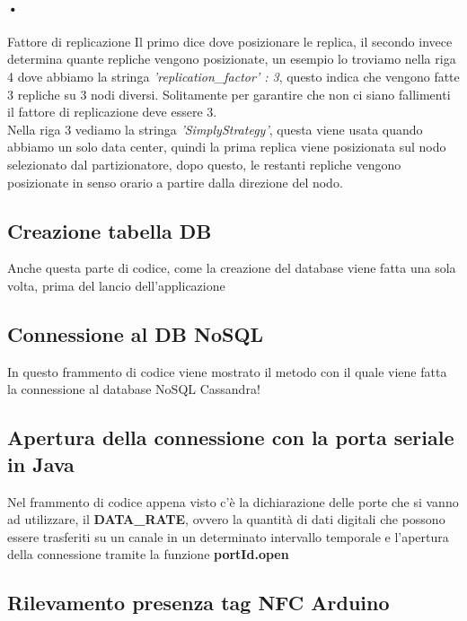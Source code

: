 \paragraph{•} Fattore di replicazione
Il primo dice dove posizionare le replica, il secondo invece determina quante repliche vengono posizionate, un esempio lo troviamo nella riga 4 dove abbiamo la stringa \textit{'replication\_factor' : 3}, questo indica che vengono fatte 3 repliche su 3 nodi diversi. Solitamente per garantire che non ci siano fallimenti il fattore di replicazione deve essere 3.
\\Nella riga 3 vediamo la stringa \textit{'SimplyStrategy'}, questa viene usata quando abbiamo un solo data center, quindi la prima replica viene posizionata sul nodo selezionato dal partizionatore, dopo questo, le restanti repliche vengono posizionate in senso orario a partire dalla direzione del nodo.
\subsection{Creazione tabella DB}


Anche questa parte di codice, come la creazione del database viene fatta una sola volta, prima del lancio dell'applicazione
\subsection{Connessione al DB NoSQL}


In questo frammento di codice viene mostrato il metodo con il quale viene fatta la connessione al database NoSQL Cassandra!
\subsection{Apertura della connessione con la porta seriale in Java}


Nel frammento di codice appena visto c'è la dichiarazione delle porte che si vanno ad utilizzare, il \textbf{DATA\_RATE}, ovvero la quantità di dati digitali che possono essere trasferiti su un canale in un determinato intervallo temporale e l'apertura della connessione tramite la funzione \textbf{portId.open}
\subsection{Rilevamento presenza tag NFC Arduino}


